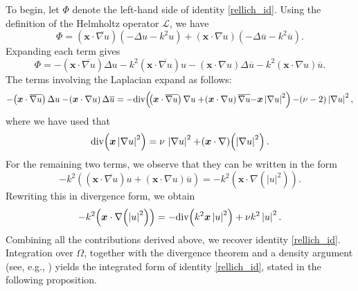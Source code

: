 \documentclass[twoside,11pt]{article}
\def\dimx{\nu }
\def\div{\text{\rm div}}
\def\L{{\mathscr{L}}}
\newcommand{\qp}[1]{\ensuremath{\!\left({#1}\right)}}
\newcommand{\norm}[1]{\ensuremath{\left|#1\right|}}
\renewcommand{\vec}[1]{\boldsymbol{#1}}
\def\L{{\mathscr{L}}}
\begin{document}
{To begin, {  let  $\Phi$ denote the left-hand side of identity \eqref{rellich_id}. Using the definition of the Helmholtz operator $\L$, we have}
  \begin{equation}
    \Phi
    =
    \qp{\vec{x} \cdot \overline{\nabla u}}
    \qp{-\Delta u - k^2 u}
    +
    \qp{\vec{x} \cdot \nabla u}
    \qp{-\Delta \overline{u} - k^2 \overline{u}}.
  \end{equation}
  Expanding each term {  gives}
  \begin{equation}
    \Phi
    =
    -\qp{\vec{x} \cdot \overline{\nabla u}} \Delta u
    -
    k^2 \qp{\vec{x} \cdot \overline{\nabla u}} u 
    -
    \qp{\vec{x} \cdot \nabla u} \Delta \overline{u}
    -
    k^2 \qp{\vec{x} \cdot \nabla u} \overline{u}.
\end{equation}
The terms involving the Laplacian {  expand as follows:}
\begin{equation}
  -\qp{\vec{x} \cdot \overline{\nabla u}} \Delta u
  -
  \qp{\vec{x} \cdot \nabla u} \Delta \overline{u}
  = 
  -\div\qp{\qp{\vec{x} \cdot \overline{\nabla u}} \nabla u
    +
    \qp{\vec{x} \cdot \nabla u} \overline{\nabla u}
    {  -
     \vec{x} \norm{\nabla u}^2}}
  {  -
  (\dimx - 2)} \norm{\nabla u}^2,
\end{equation}
{  where we have used that}
%
\begin{equation}
  \div\qp{\vec{x} \norm{\nabla u}^2} = {  \dimx}\, \norm{\nabla u}^2
  + \qp{\vec{x} \cdot \nabla}\qp{\norm{\nabla u}^2}.
\end{equation}
%
For the {  remaining}  two terms, we {  observe}  that {  they can be written in the form}
\begin{equation}
  - k^2 \qp{\qp{\vec{x} \cdot \overline{\nabla u}} u
    +
    \qp{\vec{x} \cdot \nabla u} \overline{u}}
  =
  - k^2 \qp{\vec{x} \cdot \nabla \qp{\norm{u}^2}}.
\end{equation}
Rewriting {  this} in divergence form, {  we obtain}
\begin{equation}
  - k^2 \qp{\vec{x} \cdot \nabla \qp{\norm{u}^2}}
  =
  -\div \qp{k^2 \vec{x} \norm{u}^2} + \dimx k^2 \norm{u}^2.
\end{equation}
Combining all   the  contributions  derived above, we  recover identity  \eqref{rellich_id}. 
 Integration  over $\Omega$,   together with  the divergence theorem and a density argument  
(see, e.g.,  \cite{CummingsFeng2006, Spence_Chandler-Wilde_integral_2011,  Moiola_Spence2014})
 yields the integrated form of identity \eqref{rellich_id}, stated in the following proposition.  

}
\end{document}
